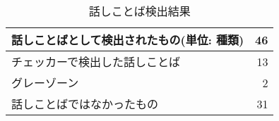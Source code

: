 \begin{table}[H]
\centering
\caption{話しことば検出結果}
\label{result-checker-klist2times}
\begin{tabular}{|l|r|}
\hline
話しことばとして検出されたもの(単位: 種類) & 46 \\ \hline
チェッカーで検出した話しことば & 13 \\ \hline
グレーゾーン & 2 \\ \hline
話しことばではなかったもの & 31 \\ \hline
\end{tabular}
\end{table} %